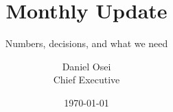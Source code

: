 \documentclass[aspectratio=169,11pt]{beamer}
\title{Monthly Update}
\subtitle{Numbers, decisions, and what we need}
\author{Daniel Osei \\ \small Chief Executive}
\date{\today}
\begin{document}
\titleslide





\end{document}
